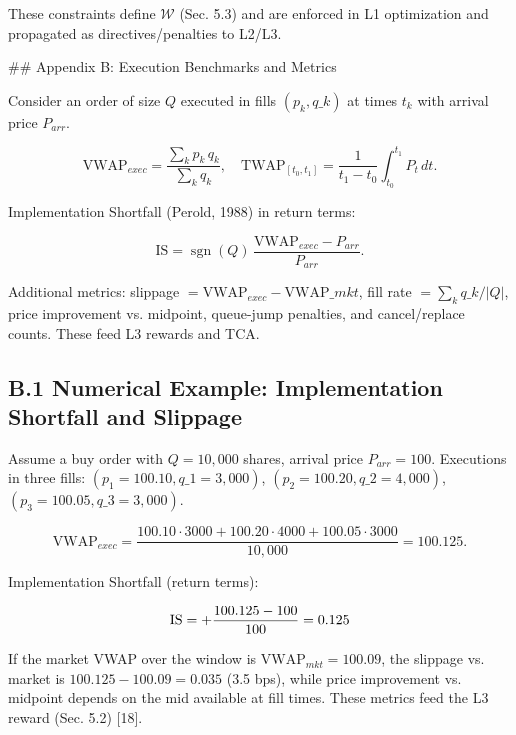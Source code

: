 \documentclass[11pt,a4paper]{article}
\begin{document}
These constraints define $\mathcal{W}$ (Sec. 5.3) and are enforced in L1 optimization and propagated as directives/penalties to L2/L3.

\#\# Appendix B: Execution Benchmarks and Metrics

Consider an order of size $Q$ executed in fills $(p_k, q\_k)$ at times $t_k$ with arrival price $P_{arr}$.

\begin{equation}
\mathrm{VWAP}_{exec} = \frac{\sum_k p_k\,q_k}{\sum_k q_k},\quad \mathrm{TWAP}_{[t_0,t_1]} = \frac{1}{t_1-t_0}\int_{t_0}^{t_1} P_t\,dt.
\end{equation}

Implementation Shortfall (Perold, 1988) in return terms:

\begin{equation}
\mathrm{IS} = \operatorname{sgn}(Q)\,\frac{\mathrm{VWAP}_{exec}-P_{arr}}{P_{arr}}.
\end{equation}

Additional metrics: slippage $= \mathrm{VWAP}_{exec}-\mathrm{VWAP}\_{mkt}$, fill rate $= \sum_k q\_k/|Q|$, price improvement vs. midpoint, queue-jump penalties, and cancel/replace counts. These feed L3 rewards and TCA.

\subsection{B.1 Numerical Example: Implementation Shortfall and Slippage}

Assume a buy order with $Q=10,000$ shares, arrival price $P_{arr}=100$. Executions in three fills: $(p_1=100.10, q\_1=3,000)$, $(p_2=100.20, q\_2=4,000)$, $(p_3=100.05, q\_3=3,000)$.

\begin{equation}
\mathrm{VWAP}_{exec} = \frac{100.10\cdot 3000 + 100.20\cdot 4000 + 100.05\cdot 3000}{10,000} = 100.125.
\end{equation}

Implementation Shortfall (return terms):

\begin{equation}
\mathrm{IS} = +\frac{100.125-100}{100} = 0.125\\%
\end{equation}

If the market VWAP over the window is $\mathrm{VWAP}_{mkt}=100.09$, the slippage vs. market is $100.125-100.09=0.035$ (3.5 bps), while price improvement vs. midpoint depends on the mid available at fill times. These metrics feed the L3 reward (Sec. 5.2) [18].
\end{document}
